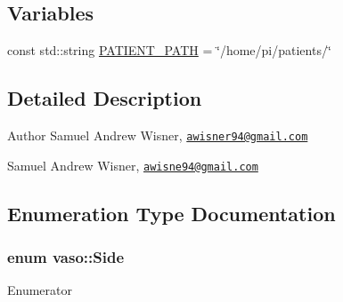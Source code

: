 \subsection*{Variables}
\begin{DoxyCompactItemize}
\item 
const std\+::string \hyperlink{namespacevaso_a0f49c8240a13e7d853912ad78d5f53c9}{P\+A\+T\+I\+E\+N\+T\+\_\+\+P\+A\+T\+H} = \char`\"{}/home/pi/patients/\char`\"{}
\end{DoxyCompactItemize}


\subsection{Detailed Description}
\begin{DoxyAuthor}{Author}
Samuel Andrew Wisner, \href{mailto:awisner94@gmail.com}{\tt awisner94@gmail.\+com}

Samuel Andrew Wisner, \href{mailto:awisne94@gmail.com}{\tt awisne94@gmail.\+com} 
\end{DoxyAuthor}


\subsection{Enumeration Type Documentation}
\hypertarget{namespacevaso_a77c5d9704657d49d456f691ddd8abf7c}{
\subsubsection[{Side}]{\setlength{\rightskip}{0pt plus 5cm}enum {\bf vaso\+::\+Side}\hspace{0.3cm}{\ttfamily [strong]}}}\label{namespacevaso_a77c5d9704657d49d456f691ddd8abf7c}
\begin{Desc}
\item[Enumerator]\par
\begin{description}
\item[{\em 
\hypertarget{namespacevaso_a77c5d9704657d49d456f691ddd8abf7ca945d5e233cf7d6240f6b783b36a374ff}{Left}\label{namespacevaso_a77c5d9704657d49d456f691ddd8abf7ca945d5e233cf7d6240f6b783b36a374ff}
}]\item[{\em 
\hypertarget{namespacevaso_a77c5d9704657d49d456f691ddd8abf7ca92b09c7c48c520c3c55e497875da437c}{Right}\label{namespacevaso_a77c5d9704657d49d456f691ddd8abf7ca92b09c7c48c520c3c55e497875da437c}
}]\end{description}
\end{Desc}


